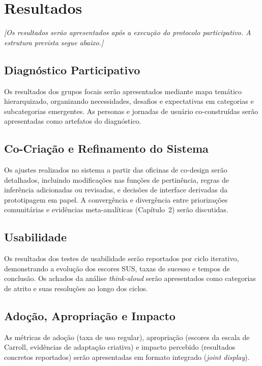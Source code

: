 \section{Resultados}

\textit{[Os resultados serão apresentados após a execução do protocolo participativo. A estrutura prevista segue abaixo.]}

\subsection{Diagnóstico Participativo}

Os resultados dos grupos focais serão apresentados mediante mapa temático hierarquizado, organizando necessidades, desafios e expectativas em categorias e subcategorias emergentes. As personas e jornadas de usuário co-construídas serão apresentadas como artefatos do diagnóstico.

\subsection{Co-Criação e Refinamento do Sistema}

Os ajustes realizados no sistema a partir das oficinas de co-design serão detalhados, incluindo modificações nas funções de pertinência, regras de inferência adicionadas ou revisadas, e decisões de interface derivadas da prototipagem em papel. A convergência e divergência entre priorizações comunitárias e evidências meta-analíticas (Capítulo~2) serão discutidas.

\subsection{Usabilidade}

Os resultados dos testes de usabilidade serão reportados por ciclo iterativo, demonstrando a evolução dos escores SUS, taxas de sucesso e tempos de conclusão. Os achados da análise \textit{think-aloud} serão apresentados como categorias de atrito e suas resoluções ao longo dos ciclos.

\subsection{Adoção, Apropriação e Impacto}

As métricas de adoção (taxa de uso regular), apropriação (escores da escala de Carroll, evidências de adaptação criativa) e impacto percebido (resultados concretos reportados) serão apresentadas em formato integrado (\textit{joint display}).


